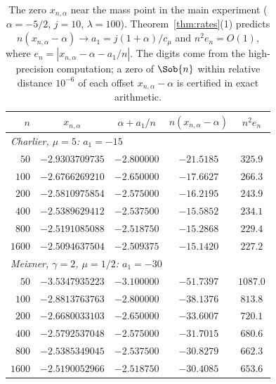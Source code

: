 \begin{table}[!htbp]
\centering
\small
\caption{The zero $x_{n,\alpha}$ near the mass point in the main experiment ($\alpha=-5/2$, $j=10$, $\lambda=100$). Theorem~\ref{thm:rates}(1) predicts $n(x_{n,\alpha}-\alpha)\to a_1=j(1+\alpha)/c_\mu$ and $n^{2}e_n=O(1)$, where $e_n=|x_{n,\alpha}-\alpha-a_1/n|$. The digits come from the high-precision computation; a zero of $\Sob{n}$ within relative distance $10^{-6}$ of each offset $x_{n,\alpha}-\alpha$ is certified in exact arithmetic.}
\label{tab:exceptional}
\renewcommand{\arraystretch}{1.15}
\begin{tabular}{rcccc}
\toprule
$n$ & $x_{n,\alpha}$ & $\alpha+a_1/n$ & $n(x_{n,\alpha}-\alpha)$ & $n^{2}e_n$\\
\midrule
\multicolumn{5}{l}{\emph{Charlier, $\mu=5$: $a_1=-15$}}\\
$50$ & $-2.9303709735$ & $-2.800000$ & $-21.5185$ & $325.9$\\
$100$ & $-2.6766269210$ & $-2.650000$ & $-17.6627$ & $266.3$\\
$200$ & $-2.5810975854$ & $-2.575000$ & $-16.2195$ & $243.9$\\
$400$ & $-2.5389629412$ & $-2.537500$ & $-15.5852$ & $234.1$\\
$800$ & $-2.5191085088$ & $-2.518750$ & $-15.2868$ & $229.4$\\
$1600$ & $-2.5094637504$ & $-2.509375$ & $-15.1420$ & $227.2$\\
\midrule
\multicolumn{5}{l}{\emph{Meixner, $\gamma=2$, $\mu=1/2$: $a_1=-30$}}\\
$50$ & $-3.5347935223$ & $-3.100000$ & $-51.7397$ & $1087.0$\\
$100$ & $-2.8813763763$ & $-2.800000$ & $-38.1376$ & $813.8$\\
$200$ & $-2.6680033103$ & $-2.650000$ & $-33.6007$ & $720.1$\\
$400$ & $-2.5792537048$ & $-2.575000$ & $-31.7015$ & $680.6$\\
$800$ & $-2.5385349045$ & $-2.537500$ & $-30.8279$ & $662.3$\\
$1600$ & $-2.5190052966$ & $-2.518750$ & $-30.4085$ & $653.6$\\
\bottomrule
\end{tabular}
\end{table}
